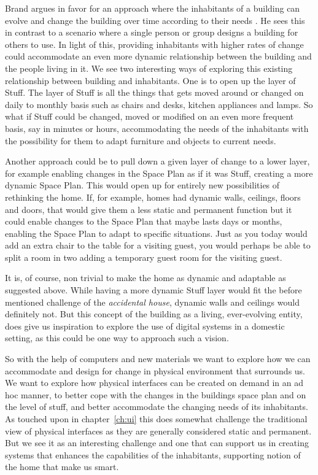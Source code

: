 Brand argues in favor for an approach where the inhabitants of a building can evolve and change the building over time according to their needs \citep{brandBBCvideo}.
He sees this in contrast to a scenario where a single person or group designs a building for others to use.
In light of this, providing inhabitants with higher rates of change could accommodate an even more dynamic relationship between the building and the people living in it.
\blank
We see two interesting ways of exploring this existing relationship between building and inhabitants.
One is to open up the layer of Stuff.
The layer of Stuff is all the things that gets moved around or changed on daily to monthly basis such as chairs and desks, kitchen appliances and lamps.
So what if Stuff could be changed, moved or modified on an even more frequent basis, say in minutes or hours, accommodating the needs of the inhabitants with the possibility for them to adapt furniture and objects to current needs.

Another approach could be to pull down a given layer of change to a lower layer, for example enabling changes in the Space Plan as if it was Stuff, creating a more dynamic Space Plan.
This would open up for entirely new possibilities of rethinking the home. 
If, for example, homes had dynamic walls, ceilings, floors and doors, that would give them a less static and permanent function but it could enable changes to the Space Plan that maybe lasts days or months, enabling the Space Plan to adapt to specific situations.
Just as you today would add an extra chair to the table for a visiting guest, you would perhaps be able to split a room in two adding a temporary guest room for the visiting guest.

It is, of course, non trivial to make the home as dynamic and adaptable as suggested above.
While having a more dynamic Stuff layer would fit the before mentioned challenge of the \emph{accidental house}, dynamic walls and ceilings would definitely not. 
But this concept of the building as a living, ever-evolving entity, does give us inspiration to explore the use of digital systems in a domestic setting, as this could be one way to approach such a vision.

So with the help of computers and new materials we want to explore how we can accommodate and design for change in physical environment that surrounds us.
We want to explore how physical interfaces can be created on demand in an ad hoc manner, to better cope with the changes in the buildings space plan and on the level of stuff, and better accommodate the changing needs of its inhabitants.
As touched upon in chapter~\ref{ch:ui} this does somewhat challenge the traditional view of physical interfaces as they are generally considered static and permanent.
But we see it as an interesting challenge and one that can support us in creating systems that enhances the capabilities of the inhabitants, supporting \citet{taylor2007homes} notion of the home that make us smart.